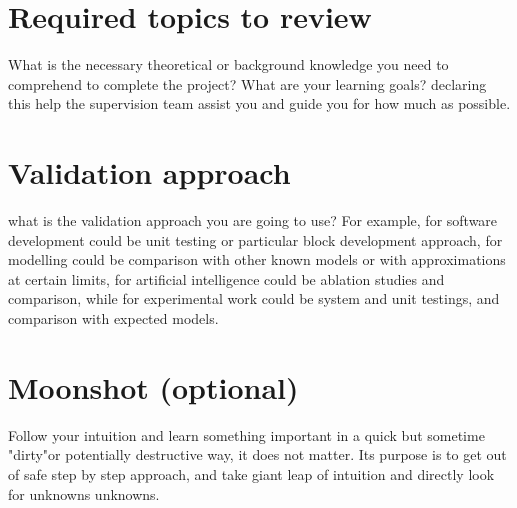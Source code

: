 \documentclass{article}
\begin{document}


\section{Required topics to review}
What is the necessary theoretical or background knowledge you need to comprehend to complete the project? What are your learning goals? declaring this help the supervision team assist you and guide you for how much as possible.


\section{Validation approach}
 what is the validation approach you are going to use? For example, for software development could be unit testing or particular block development approach, for modelling could be comparison with other known models or with approximations at certain limits, for artificial intelligence could be ablation studies and comparison, while for experimental work could be system and unit testings, and comparison with expected models. 

\section{Moonshot (optional)}
Follow your intuition and learn something important in a quick but sometime "dirty"or potentially destructive way, it does not matter. Its purpose is to get out of safe step by step approach, and take giant leap of intuition and directly look for unknowns unknowns. 
\end{document}
